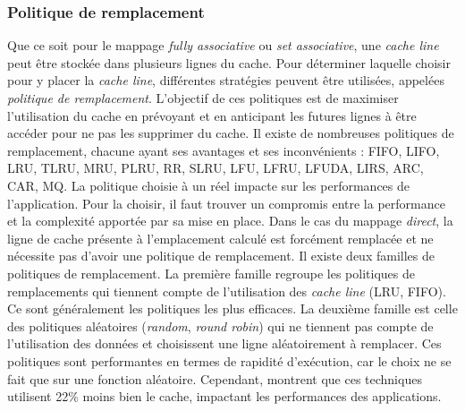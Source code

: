 



\subsubsection{Politique de remplacement}
Que ce soit pour le mappage \textit{fully associative} ou \textit{set associative}, une \textit{cache line} peut être stockée dans plusieurs lignes du cache. Pour déterminer laquelle choisir pour y placer la \textit{cache line}, différentes stratégies peuvent être utilisées, appelées \textit{politique de remplacement}. L'objectif de ces politiques est de maximiser l'utilisation du cache en prévoyant et en anticipant les futures lignes à être accéder pour ne pas les supprimer du cache. Il existe de nombreuses politiques de remplacement, chacune ayant ses avantages et ses inconvénients \cite{wikipedia2_2019}: FIFO, LIFO, LRU, TLRU, MRU, PLRU, RR, SLRU, LFU, LFRU, LFUDA, LIRS, ARC, CAR, MQ. La politique choisie à un réel impacte sur les performances de l'application. Pour la choisir, il faut trouver un compromis entre la performance et la complexité apportée par sa mise en place. Dans le cas du mappage \textit{direct}, la ligne de cache présente à l'emplacement calculé est forcément remplacée et ne nécessite pas d'avoir une politique de remplacement. Il existe deux familles de politiques de remplacement. La première famille regroupe les politiques de remplacements qui tiennent compte de l'utilisation des \textit{cache line} (LRU, FIFO). Ce sont généralement les politiques les plus efficaces. La deuxième famille est celle des politiques aléatoires (\textit{random}, \textit{round robin}) qui ne tiennent pas compte de l'utilisation des données et choisissent une ligne aléatoirement à remplacer. Ces politiques sont performantes en termes de rapidité d'exécution, car le choix ne se fait que sur une fonction aléatoire. Cependant, \cite{Al-Zoubi:2004:PEC:986537.986601} montrent que ces techniques utilisent 22\% moins bien le cache, impactant les performances des applications.

